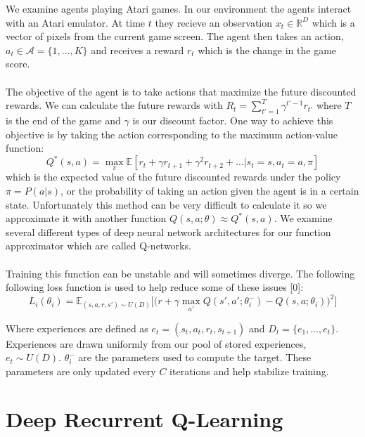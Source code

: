 \documentclass{article}
\begin{document}
We examine agents playing Atari games. In our environment the agents interact with
an Atari emulator. At time $t$ they recieve an observation $x_t \in \mathbb{R}^D$
which is a vector of pixels from the current game screen. The agent then takes an
action, $a_t \in \mathcal{A} = \{1, \dots, K\}$ and receives a reward $r_t$ which
is the change in the game score. \\
\\
The objective of the agent is to take actions that maximize the future discounted
rewards. We can calculate the future rewards with $R_t = \sum_{t' = 1}^T \gamma^{t'-1}r_{t'}$
where $T$ is the end of the game and $\gamma$ is our discount factor. One way
to achieve this objective is by taking the action corresponding to the maximum
action-value function:
$$Q^*(s,a) = \max_{\pi}\mathbb{E}[r_t + \gamma r_{t+1} + \gamma^2 r_{t+2} + \dots
|s_t = s, a_t = a, \pi]$$
which is the expected value of the future discounted rewards under the policy
$\pi = P(a|s)$, or the probability of taking an action given the agent is in a
certain state. Unfortunately this method can be very difficult to calculate it
so we approximate it with another function $Q(s,a;\theta) \approx Q^*(s,a)$. We
examine several different types of deep neural network architectures for our
function approximator which are called Q-networks. \\
\\
Training this function can be unstable and will sometimes diverge. The following
following loss function is used to help reduce some of these issues [0]:
\begin{equation}
    L_i(\theta_i) = \mathbb{E}_{(s,a,r,s') \sim U(D)}\Big[\Big(
    r + \gamma \max_{a'}Q(s',a';\theta_i^-) - Q(s,a;\theta_i)\Big)^2\Big]
\end{equation}

Where experiences are defined as $e_t = (s_t, a_t, r_t, s_{t+1})$ and
$D_t = \{e_1, \dots, e_t\}$. Experiences are drawn uniformly from our pool of
stored experiences, $e_t \sim U(D)$. $\theta_i^-$ are the parameters used to compute
the target. These parameters are only updated every $C$ iterations and help
stabilize training.

\section{Deep Recurrent Q-Learning}
\end{document}
